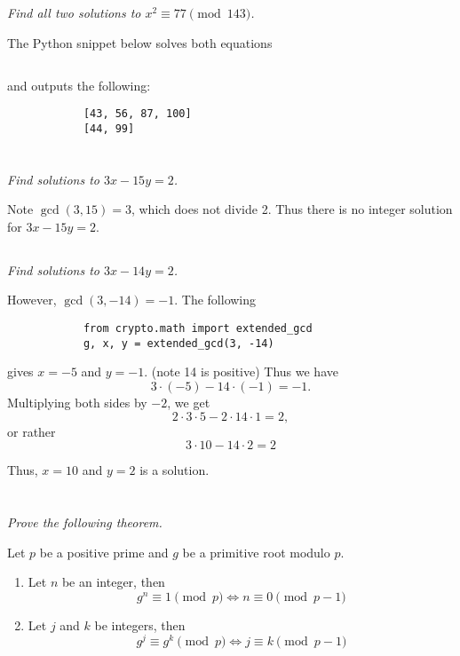 \documentclass[12pt]{article}
\begin{document}
    \subsection{} \textit{Find all two solutions to $x^2 \equiv 77 \pmod{143}$.}

        The Python snippet below solves both equations

        \inputminted{python}{hw2_3.py}

        and outputs the following:

        \begin{verbatim}
            [43, 56, 87, 100]
            [44, 99]
        \end{verbatim}

\section{}
    \subsection{} \textit{Find solutions to $3x - 15y = 2$.}

        Note $\gcd(3, 15) = 3$, which does not divide 2. Thus there is no integer solution for $3x - 15y = 2$.
    \subsection{} \textit{Find solutions to $3x - 14y = 2$.}

        However, $\gcd(3, -14) = -1$. The following

        \begin{verbatim}
            from crypto.math import extended_gcd
            g, x, y = extended_gcd(3, -14)
        \end{verbatim}

        gives $x = -5$ and $y = -1$. (note 14 is positive) Thus we have $$3 \cdot (-5) - 14 \cdot (-1) = -1.$$ Multiplying both sides by $-2$, we get $$2 \cdot 3 \cdot 5 - 2 \cdot 14 \cdot 1 = 2,$$ or rather $$3 \cdot 10 - 14 \cdot 2 = 2$$

        Thus, $x = 10$ and $y = 2$ is a solution.

\section{} \textit{Prove the following theorem.}
    \begin{thm}
        Let $p$ be a positive prime and $g$ be a primitive root modulo $p$.
        \begin{enumerate}
            \item Let $n$ be an integer, then $$g^n \equiv 1 \pmod{p} \Longleftrightarrow n \equiv 0 \pmod{p - 1}$$
            \item Let $j$ and $k$ be integers, then $$g^j \equiv g^k \pmod{p} \Longleftrightarrow j \equiv k \pmod{p - 1}$$
        \end{enumerate}
    \end{thm}
\end{document}
